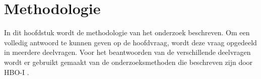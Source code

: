 \section{Methodologie}
In dit hoofdstuk wordt de methodologie van het onderzoek beschreven.
Om een volledig antwoord te kunnen geven op de hoofdvraag, wordt deze vraag opgedeeld in meerdere deelvragen.
Voor het beantwoorden van de verschillende deelvragen wordt er gebruikt gemaakt van de onderzoeksmethoden die beschreven zijn door HBO-I \Parencite{HBO-i-reasearch-methods}.


\newpage


\newpage

